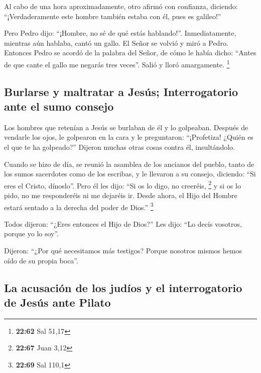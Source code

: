  Al cabo de una hora aproximadamente, otro afirmó con
confianza, diciendo: ``¡Verdaderamente este hombre también estaba con
él, pues es galileo!''

 Pero Pedro dijo: ``¡Hombre, no sé de qué estás
hablando!''. Inmediatamente, mientras aún hablaba, cantó un gallo.
 El Señor se volvió y miró a Pedro. Entonces Pedro se
acordó de la palabra del Señor, de cómo le había dicho: ``Antes de que
cante el gallo me negarás tres veces''.  Salió y lloró
amargamente. \footnote{\textbf{22:62} Sal 51,17}

\hypertarget{burlarse-y-maltratar-a-jesuxfas-interrogatorio-ante-el-sumo-consejo}{%
\subsection{Burlarse y maltratar a Jesús; Interrogatorio ante el sumo
consejo}\label{burlarse-y-maltratar-a-jesuxfas-interrogatorio-ante-el-sumo-consejo}}

 Los hombres que retenían a Jesús se burlaban de él y lo
golpeaban.  Después de vendarle los ojos, le golpearon en
la cara y le preguntaron: ``¡Profetiza! ¿Quién es el que te ha
golpeado?''  Dijeron muchas otras cosas contra él,
insultándolo.

 Cuando se hizo de día, se reunió la asamblea de los
ancianos del pueblo, tanto de los sumos sacerdotes como de los escribas,
y le llevaron a su consejo, diciendo:  ``Si eres el
Cristo, dínoslo''. Pero él les dijo: ``Si os lo digo, no creeréis,
\footnote{\textbf{22:67} Juan 3,12}  y si os lo pido, no
me responderéis ni me dejaréis ir.  Desde ahora, el Hijo
del Hombre estará sentado a la derecha del poder de Dios.'' \footnote{\textbf{22:69}
  Sal 110,1}

 Todos dijeron: ``¿Eres entonces el Hijo de Dios?'' Les
dijo: ``Lo decís vosotros, porque yo lo soy''.

 Dijeron: ``¿Por qué necesitamos más testigos? Porque
nosotros mismos hemos oído de su propia boca''.

\hypertarget{la-acusaciuxf3n-de-los-juduxedos-y-el-interrogatorio-de-jesuxfas-ante-pilato}{%
\subsection{La acusación de los judíos y el interrogatorio de Jesús ante
Pilato}\label{la-acusaciuxf3n-de-los-juduxedos-y-el-interrogatorio-de-jesuxfas-ante-pilato}}

